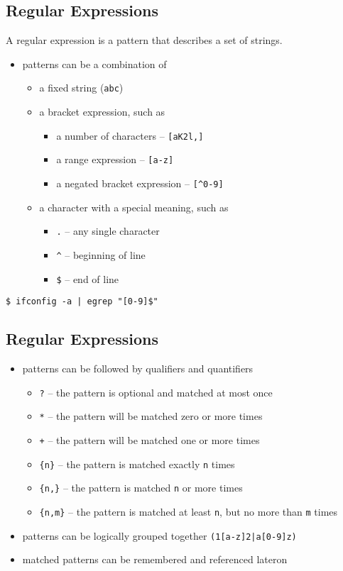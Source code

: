 \documentclass[xga]{xdvislides}
\begin{document}
\subsection{Regular Expressions}
A regular expression is a pattern that describes a set of strings. \\

\begin{itemize}
	\item patterns can be a combination of
		\begin{itemize}
			\item a fixed string (\verb+abc+)
			\item a bracket expression, such as
				\begin{itemize}
					\item a number of characters -- \verb+[aK2l,]+
					\item a range expression -- \verb+[a-z]+
					\item a negated bracket expression -- \verb+[^0-9]+
				\end{itemize}
			\item a character with a special meaning, such as
				\begin{itemize}
					\item \verb+.+ -- any single character
					\item \verb+^+ -- beginning of line
					\item \verb+$+ -- end of line
				\end{itemize}
		\end{itemize}
\end{itemize}
\vspace{.5in}
\begin{verbatim}
$ ifconfig -a | egrep "[0-9]$"
\end{verbatim}

\subsection{Regular Expressions}
\begin{itemize}
	\item patterns can be followed by qualifiers and quantifiers
		\begin{itemize}
			\item \verb+?+ -- the pattern is optional and matched at most once
			\item \verb+*+ -- the pattern will be matched zero or more times
			\item \verb|+| -- the pattern will be matched one or more times
			\item \verb+{n}+ -- the pattern is matched exactly \verb+n+ times
			\item \verb+{n,}+ -- the pattern is matched \verb+n+ or more times
			\item \verb+{n,m}+ -- the pattern is matched at least \verb+n+,
				but no more than \verb+m+ times
		\end{itemize}
	\item patterns can be logically grouped together \verb+(1[a-z]2|a[0-9]z)+
	\item matched patterns can be remembered and referenced lateron
\end{itemize}
\end{document}
